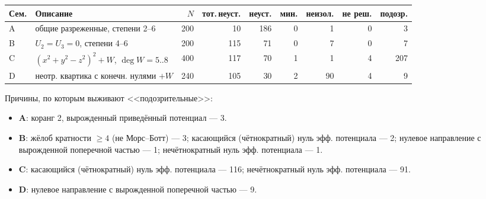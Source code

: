 \begin{center}\small
\begin{tabular}{llrrrrrrr}
\toprule
Сем. & Описание & $N$ & тот.\,неуст. & неуст. & мин. & неизол. & не реш. & подозр.\\
\midrule
A & общие разреженные, степени 2--6 & 200 & 10 & 186 & 0 & 1 & 0 & 3\\
B & $U_2=U_3=0$, степени 4--6 & 200 & 115 & 71 & 0 & 7 & 0 & 7\\
C & $(x^2+y^2-z^2)^2+W$, $\deg W=5..8$ & 400 & 117 & 70 & 1 & 1 & 4 & 207\\
D & неотр. квартика с конечн. нулями $+W$ & 240 & 105 & 30 & 2 & 90 & 4 & 9\\
\bottomrule
\end{tabular}
\end{center}
Причины, по которым выживают <<подозрительные>>:
\begin{itemize}[leftmargin=*]
\item \textbf{A}: коранг 2, вырожденный приведённый потенциал --- 3.
\item \textbf{B}: жёлоб кратности $\ge4$ (не Морс--Ботт) --- 3; касающийся (чётнократный) нуль эфф. потенциала --- 2; нулевое направление с вырожденной поперечной частью --- 1; нечётнократный нуль эфф. потенциала --- 1.
\item \textbf{C}: касающийся (чётнократный) нуль эфф. потенциала --- 116; нечётнократный нуль эфф. потенциала --- 91.
\item \textbf{D}: нулевое направление с вырожденной поперечной частью --- 9.
\end{itemize}